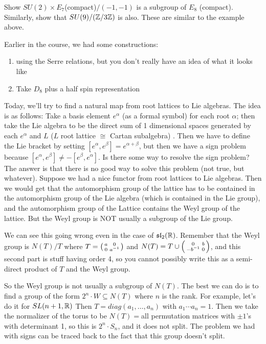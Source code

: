  \begin{exercise}
   Show $SU(2)\times E_7$(compact)$/(-1,-1)$ is a subgroup of $E_8$ (compact).
   Similarly, show that $SU(9)/(\mathbb{Z}/3\mathbb{Z})$ is also. These are similar to the example
   above.
 \end{exercise}

  Earlier in the course, we had some constructions:
 \begin{enumerate}
   \item using the Serre relations, but you don't really have an idea of what it looks
   like
   \item Take $D_8$ plus a half spin representation
 \end{enumerate}
 Today, we'll try to find a natural map from root lattices to Lie algebras.
 The idea is as follows: Take a basis element $e^\alpha$ (as a formal symbol)
 for each root $\alpha$; then take the Lie algebra to be the direct sum of
   1 dimensional spaces generated by each $e^\alpha$ and $ L$ ($L$ root lattice
   $\cong$ Cartan subalgebra) . Then we have to define the Lie bracket by setting
   $[e^\alpha,e^\beta]=e^{\alpha+\beta}$, but then we have a sign problem because
   $[e^\alpha,e^\beta]\neq -[e^\beta,e^\alpha]$.  Is there some way to resolve the
   sign problem? The answer is that there is no good way to solve this problem (not
   true, but whatever). Suppose we had a nice functor from root lattices to Lie
   algebras. Then we would get that the automorphism group of the lattice has to be
   contained in the automorphism group of the Lie algebra (which is contained in the
   Lie group), and the automorphism group of the Lattice contains the Weyl group of
   the lattice. But the Weyl group is NOT usually a subgroup of the Lie group.

 We can see this going wrong even in the case of $\mathfrak{sl}_2(\mathbb{R})$. Remember that the Weyl
 group is $N(T)/T$ where $T=\left( \begin{smallmatrix} a & 0 \\ 0 & a^{-1} \end{smallmatrix} \right)$ and $N(T)=T\cup \left( \begin{smallmatrix} 0 & b \\ -b^{-1} & 0 \end{smallmatrix} \right)$, and this second part is stuff having order 4, so you cannot possibly
 write this as a semi-direct product of $T$ and the Weyl group.

 So the Weyl group is not usually a subgroup of $N(T)$. The best we can do is to find
 a group of the form $2^n\cdot W\subseteq N(T)$ where $n$ is the rank. For example,
 let's do it for $SL(n+1,\mathbb{R})$ Then $T = diag(a_1,\dots, a_n)$ with $a_1\cdots a_n=1$.
 Then we take the normalizer of the torus to be $N(T)=$all permutation matrices with
 $\pm 1$'s with determinant 1, so this is $2^n\cdot S_n$, and it does not split. The
 problem we had with signs can be traced back to the fact that this group doesn't
 split.

